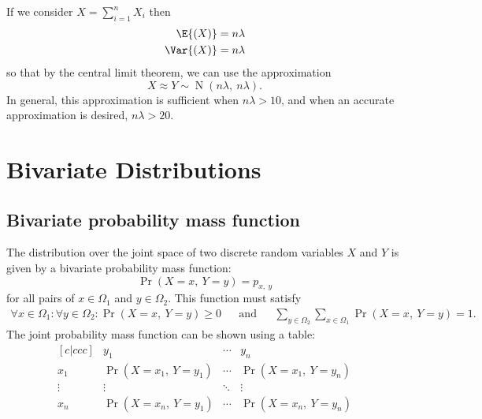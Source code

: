 \documentclass{article}
\begin{document}
\begin{multicols}{3}
    If we consider \(X = \sum_{i = 1}^n X_i\) then
    \begin{align*}
        \E{\left( X \right)}   & = n \lambda \\
        \Var{\left( X \right)} & = n \lambda
    \end{align*}
    so that by the central limit theorem, we can use the approximation
    \begin{equation*}
        X \approx Y \sim \operatorname{N}{\left( n\lambda,\: n\lambda \right)}.
    \end{equation*}
    In general, this approximation is sufficient when \(n \lambda > 10\), and when an accurate approximation is desired, \(n \lambda > 20\).
    \section{Bivariate Distributions}
    \subsection{Bivariate probability mass function}
    The distribution over the joint space of two discrete random variables \(X\) and \(Y\) is given by a bivariate probability mass function:
    \begin{equation*}
        \Pr{\left( X = x,\: Y = y \right)} = p_{x,\: y}
    \end{equation*}
    for all pairs of \(x \in \Omega_1\) and \(y \in \Omega_2\). This function must satisfy
    \begin{align*}
        \forall x \in \Omega_1 : \forall y \in \Omega_2 : \Pr{\left( X = x,\: Y = y \right)} \geq 0 &  & \text{and} &  &
        \sum_{y \in \Omega_2} \sum_{x \in \Omega_1} \Pr{\left( X = x,\: Y = y \right)} = 1.
    \end{align*}
    The joint probability mass function can be shown using a table:
    {\small
    \begin{equation*}
        \begin{matrix}[c|ccc] %
                               & y_1                                    & \cdots & y_n                                    \\
            \hline %
            x_1                & \Pr{\left( X = x_1,\: Y = y_1 \right)} & \cdots & \Pr{\left( X = x_1,\: Y = y_n \right)} \\
            \vdots             & \vdots                                 & \ddots & \vdots                                 \\
            x_n                & \Pr{\left( X = x_n,\: Y = y_1 \right)} & \cdots & \Pr{\left( X = x_n,\: Y = y_n \right)}
        \end{matrix}
    \end{equation*}
    }

\end{multicols}
\end{document}
